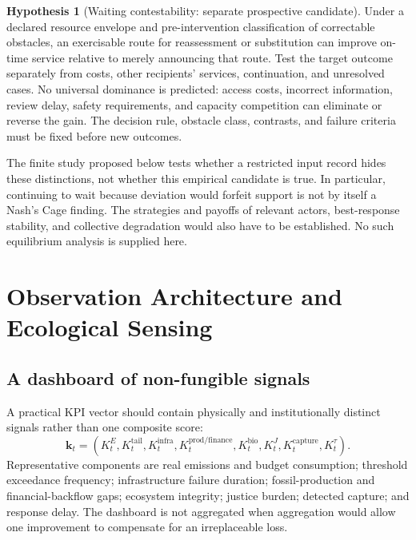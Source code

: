 \documentclass[11pt,a4paper]{article}
\numberwithin{equation}{section}
\theoremstyle{definition}
\newtheorem{hypothesis}[definition]{Hypothesis}
\theoremstyle{plain}
\theoremstyle{remark}
\newcommand{\kpi}{\bm{k}}
\begin{document}
\begin{hypothesis}[Waiting contestability: separate prospective candidate]
\label{hyp:contestability}
Under a declared resource envelope and pre-intervention classification of correctable obstacles, an exercisable route for reassessment or substitution can improve on-time service relative to merely announcing that route. Test the target outcome separately from costs, other recipients' services, continuation, and unresolved cases. No universal dominance is predicted: access costs, incorrect information, review delay, safety requirements, and capacity competition can eliminate or reverse the gain. The decision rule, obstacle class, contrasts, and failure criteria must be fixed before new outcomes.
\end{hypothesis}

The finite study proposed below tests whether a restricted input record hides these distinctions, not whether this empirical candidate is true. In particular, continuing to wait because deviation would forfeit support is not by itself a Nash's Cage finding. The strategies and payoffs of relevant actors, best-response stability, and collective degradation would also have to be established. No such equilibrium analysis is supplied here.

\section{Observation Architecture and Ecological Sensing}

\subsection{A dashboard of non-fungible signals}

A practical KPI vector should contain physically and institutionally distinct signals rather than one composite score:
\begin{equation}
\kpi_t=
\left(
K_t^{E},K_t^{\mathrm{tail}},K_t^{\mathrm{infra}},K_t^{\mathrm{prod/finance}},
K_t^{\mathrm{bio}},K_t^{J},K_t^{\mathrm{capture}},K_t^{\tau}
\right).
\label{eq:dashboard}
\end{equation}
Representative components are real emissions and budget consumption; threshold exceedance frequency; infrastructure failure duration; fossil-production and financial-backflow gaps; ecosystem integrity; justice burden; detected capture; and response delay. The dashboard is not aggregated when aggregation would allow one improvement to compensate for an irreplaceable loss.
\end{document}

